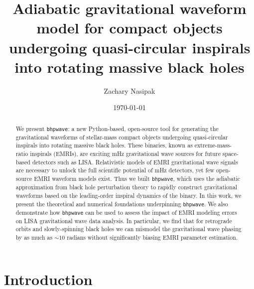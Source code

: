 \documentclass[%
 reprint,
 nofootinbib,
 amsmath,amssymb,
 aps,
 prd,
]{revtex4-2}
\begin{document}

\title{Adiabatic gravitational waveform model for compact objects undergoing quasi-circular inspirals into rotating massive black holes}%

\author{Zachary Nasipak}

\date{\today}%

\begin{abstract}
We present \texttt{bhpwave}: a new Python-based, open-source tool for generating the gravitational waveforms of stellar-mass compact objects undergoing quasi-circular inspirals into rotating massive black holes. These binaries, known as extreme-mass-ratio inspirals (EMRIs), are exciting mHz gravitational wave sources for future space-based detectors such as LISA. Relativistic models of EMRI gravitational wave signals are necessary to unlock the full scientific potential of mHz detectors, yet few open-source EMRI waveform models exist. Thus we built \texttt{bhpwave}, which uses the adiabatic approximation from black hole perturbation theory to rapidly construct gravitational waveforms based on the leading-order inspiral dynamics of the binary. In this work, we present the theoretical and numerical foundations underpinning \texttt{bhpwave}. We also demonstrate how \texttt{bhpwave} can be used to assess the impact of EMRI modeling errors on LISA gravitational wave data analysis. In particular, we find that for retrograde orbits and slowly-spinning black holes we can mismodel the gravitational wave phasing by as much as $\sim 10$ radians without significantly biasing EMRI parameter estimation.
\end{abstract}

\maketitle

\section{Introduction}
\label{sec:intro}
\end{document}
